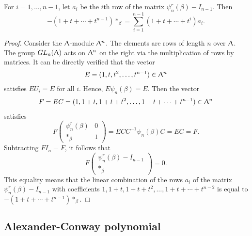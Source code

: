 \begin{lemma}
\label{sec:burau-representation-3}
For $i = 1, \ldots, n-1$, let $a_i$ be the $i$th row of the matrix $\psi_n^r(\beta ) - I_{n-1}$. Then 
\begin{displaymath}
-(1 + t + \cdots + t^{n-1})*_{\beta} = \sum_{i=1}^{n-1} (1+ t + \cdots + t^i)a_i.
\end{displaymath}
\end{lemma}

\begin{proof}
\label{sec:burau-representation-4}
Consider the $\Uplambda$-module $\Uplambda^n$. The elements are rows of length $n$ over $\Uplambda$. The group $GL_n(\Uplambda)$ acts on $\Uplambda^n$ on the right via the multiplication of rows by matrices. It can be directly verified that the vector 
\begin{displaymath}
E = (1, t, t^2, \ldots, t^{n-1}) \in \Uplambda^n
\end{displaymath}
satisfies $EU_i = E$ for all $i$. Hence, $E\psi_n(\beta) = E$. Then the vector 
\begin{displaymath}
F = EC = (1, 1 + t, 1 + t + t^2, \ldots, 1 + t + \cdots + t^{n-1}) \in \Uplambda^n
\end{displaymath} satisfies 
\begin{displaymath}
F \begin{pmatrix} \psi_n^r(\beta) & 0 \\ *_{\beta} & 1 \end{pmatrix} = ECC^{-1}\psi_n(\beta) C = EC = F.
\end{displaymath}
Subtracting $FI_n = F$, it follows that 
\begin{displaymath}
F \begin{pmatrix} \psi_n^r(\beta) - I_{n-1} \\ *_{\beta} \end{pmatrix} = 0.
\end{displaymath}
This equality means that the linear combination of the rows $a_i$ of the matrix $\psi_n^r(\beta) - I_{n-1}$ with coefficients $1, 1+t, 1 + t + t^2, \ldots, 1 + t + \cdots + t^{n-2}$ is equal to $-(1 + t + \cdots + t^{n-1})*_{\beta}$.
\end{proof}


\subsection{Alexander-Conway polynomial}

